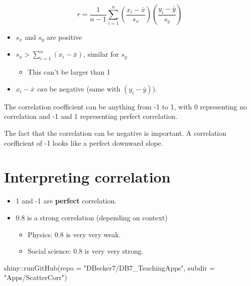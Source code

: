 \documentclass[
  letterpaper,
  DIV=11,
  numbers=noendperiod]{scrreprt}
\newenvironment{Shaded}{\begin{snugshade}}{\end{snugshade}}
\newcommand{\AttributeTok}[1]{\textcolor[rgb]{0.40,0.45,0.13}{#1}}
\newcommand{\FunctionTok}[1]{\textcolor[rgb]{0.28,0.35,0.67}{#1}}
\newcommand{\NormalTok}[1]{\textcolor[rgb]{0.00,0.23,0.31}{#1}}
\newcommand{\SpecialCharTok}[1]{\textcolor[rgb]{0.37,0.37,0.37}{#1}}
\newcommand{\StringTok}[1]{\textcolor[rgb]{0.13,0.47,0.30}{#1}}
\providecommand{\tightlist}{%
  \setlength{\itemsep}{0pt}\setlength{\parskip}{0pt}}\usepackage{longtable,booktabs,array}
\begin{document}
\[
r = \frac{1}{n-1}\sum_{i=1}^n\left(\frac{x_i - \bar x}{s_x}\right)\left(\frac{y_i - \bar y}{s_y}\right)
\]

\begin{itemize}
\tightlist
\item
  \(s_x\) and \(s_y\) are positive\lspace
\item
  \(s_x > \sum_{i=1}^n(x_i - \bar x)\), similar for \(s_y\)

  \begin{itemize}
  \tightlist
  \item
    This can't be larger than 1\lspace
  \end{itemize}
\item
  \(x_i - \bar x\) \emph{can} be negative (same with \((y_i-\bar y)\)).
\end{itemize}

\pspace

The correlation coefficient can be anything from -1 to 1, with 0
representing no correlation and -1 and 1 representing perfect
correlation.

The fact that the correlation can be negative is important. A
correlation coefficient of -1 looks like a perfect downward slope.

\hypertarget{interpreting-correlation}{%
\section{Interpreting correlation}\label{interpreting-correlation}}

\begin{itemize}
\tightlist
\item
  1 and -1 are \textbf{perfect} correlation.\lspace
\item
  0.8 is a strong correlation (depending on context)

  \begin{itemize}
  \tightlist
  \item
    Physics: 0.8 is very very weak.
  \item
    Social science: 0.8 is very very strong.
  \end{itemize}
\end{itemize}

\pspace

\begin{Shaded}
\begin{Highlighting}[]
\NormalTok{shiny}\SpecialCharTok{::}\FunctionTok{runGitHub}\NormalTok{(}\AttributeTok{repo =} \StringTok{"DBecker7/DB7\_TeachingApps"}\NormalTok{, }
    \AttributeTok{subdir =} \StringTok{"Apps/ScatterCorr"}\NormalTok{)}
\end{Highlighting}
\end{Shaded}
\end{document}
